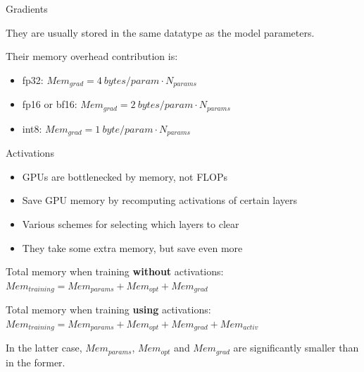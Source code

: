 
\begin{vbframe}{Gradients}

\vfill

They are usually stored in the same datatype as the model parameters. \newline

Their memory overhead contribution is: \newline


\begin{itemize}
 	\item fp32: $Mem_{grad} = 4 ~bytes/param \cdot N_{params}$
 	\item fp16 or bf16: $Mem_{grad} = 2 ~bytes/param \cdot N_{params}$
	\item int8: $Mem_{grad} = 1 ~byte/param \cdot N_{params}$
\end{itemize}

\vfill

\end{vbframe}


\begin{vbframe}{Activations}

\vfill

\begin{itemize}
 	\item GPUs are bottlenecked by memory, not FLOPs
 	\item Save GPU memory by recomputing activations of certain layers
	\item Various schemes for selecting which layers to clear
	\item They take some extra memory, but save even more
\end{itemize}

\vskip5mm

Total memory when training \textbf{without} activations: \newline
$Mem_{training} = Mem_{params} + Mem_{opt} + Mem_{grad}$

\vskip5mm

Total memory when training \textbf{using} activations: \newline
$Mem_{training} = Mem_{params} + Mem_{opt} + Mem_{grad} + Mem_{activ}$

\vskip5mm

In the latter case, $Mem_{params}$, $Mem_{opt}$ and $Mem_{grad}$ are significantly smaller than in the former.

\vfill

\end{vbframe}

